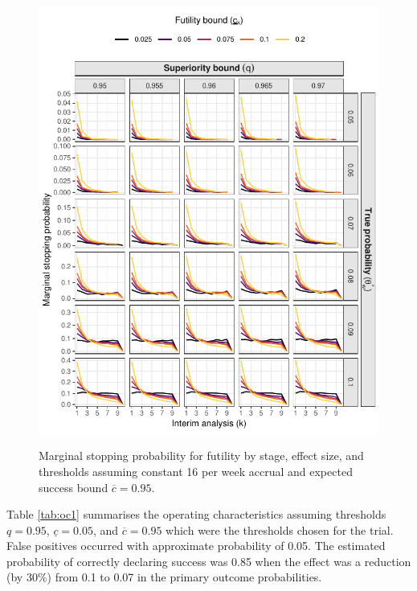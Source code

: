 \documentclass{bmcart}
\begin{document}
\begin{figure}[!ht]
	\caption{Marginal stopping probability for futility by stage, effect size, and thresholds assuming constant 16 per week accrual and expected success bound $\overline{c}=0.95$.}
	\includegraphics{stop_futility_16.pdf}
	\label{fig:stop_futility_16}
\end{figure}

Table \ref{tab:oc1} summarises the operating characteristics assuming thresholds $q=0.95$, $\underline{c}=0.05$, and $\overline{c}=0.95$ which were the thresholds chosen for the trial.
False positives occurred with approximate probability of 0.05.
The estimated probability of correctly declaring success was 0.85 when the effect was a reduction (by 30\%) from 0.1 to 0.07 in the primary outcome probabilities.
\end{document}
